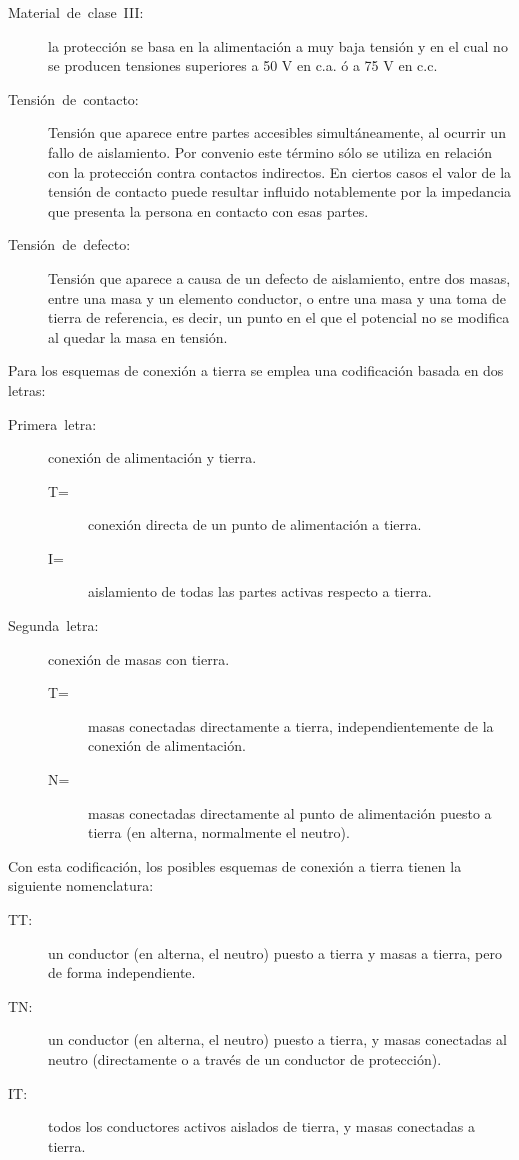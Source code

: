 \begin{description}
\item [{Material~de~clase~III:}] la protección se basa en la
  alimentación a muy baja tensión y en el cual no se producen
  tensiones superiores a 50 V en c.a. ó a 75 V en c.c.
\item [{Tensión~de~contacto:}] Tensión que aparece entre partes
  accesibles simultáneamente, al ocurrir un fallo de aislamiento. Por
  convenio este término sólo se utiliza en relación con la protección
  contra contactos indirectos. En ciertos casos el valor de la tensión
  de contacto puede resultar influido notablemente por la impedancia
  que presenta la persona en contacto con esas partes.
\item [{Tensión~de~defecto:}] Tensión que aparece a causa de un
  defecto de aislamiento, entre dos masas, entre una masa y un
  elemento conductor, o entre una masa y una toma de tierra de
  referencia, es decir, un punto en el que el potencial no se modifica
  al quedar la masa en tensión.
\end{description}
Para los esquemas de conexión a tierra se emplea una codificación
basada en dos letras:
\begin{description}
\item [{Primera~letra:}] conexión de alimentación y tierra.

\begin{description}
\item [{T=}] conexión directa de un punto de alimentación a tierra.
\item [{I=}] aislamiento de todas las partes activas respecto a tierra.
\end{description}
\item [{Segunda~letra:}] conexión de masas con tierra.

\begin{description}
\item [{T=}] masas conectadas directamente a tierra, independientemente
de la conexión de alimentación.
\item [{N=}] masas conectadas directamente al punto de alimentación puesto
a tierra (en alterna, normalmente el neutro).
\end{description}
\end{description}
Con esta codificación, los posibles esquemas de conexión a tierra
tienen la siguiente nomenclatura:
\begin{description}
\item [{TT:}] un conductor (en alterna, el neutro) puesto a tierra y masas
a tierra, pero de forma independiente. 
\item [{TN:}] un conductor (en alterna, el neutro) puesto a tierra, y masas
conectadas al neutro (directamente o a través de un conductor de protección).
\item [{IT:}] todos los conductores activos aislados de tierra, y masas
conectadas a tierra. 
\end{description}
